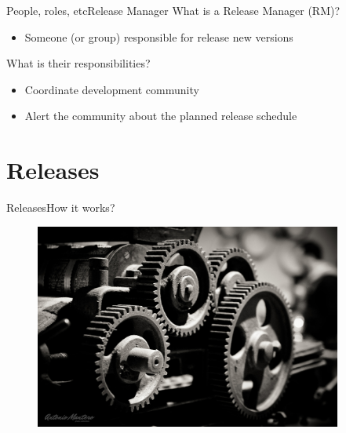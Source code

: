 \documentclass[10pt]{beamer}
\begin{document}
\begin{frame}{People, roles, etc}{Release Manager}
  What is a Release Manager (RM)? \pause
  \begin{itemize}
    \item Someone (or group) responsible for release new versions \pause
  \end{itemize}

  What is their responsibilities? \pause
  \begin{itemize}
    \item Coordinate development community \pause
    \item Alert the community about the planned release schedule
  \end{itemize}
\end{frame}

\section{Releases}
\begin{frame}{Releases}{How it works?}
  \begin{figure}[ht]
    \centering
    \includegraphics[width=0.9\textwidth, keepaspectratio=true]{images/gears.jpg}
  \end{figure}
\end{frame}
\end{document}

